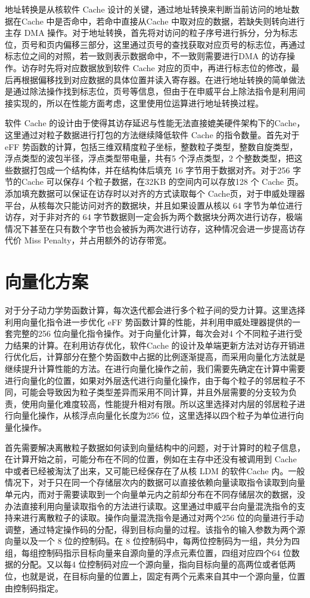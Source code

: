 地址转换是从核软件 Cache 设计的关键，通过地址转换来判断当前访问的地址数据在Cache 中是否命中，若命中直接从Cache 中取对应的数据，若缺失则转向进行主存 DMA 操作。对于地址转换，首先将对访问的粒子序号进行拆分，分为标志位，页号和页内偏移三部分，这里通过页号的查找获取对应页号的标志位，再通过标志位之间的对照，若一致则表示数据命中，不一致则需要进行DMA 的访存操作。访存时先将对应数据放到软件 Cache 对应的页中，再进行标志位的修改，最后再根据偏移找到对应数据的具体位置并读入寄存器。在进行地址转换的简单做法是通过除法操作找到标志位，页号等信息，但由于在申威平台上除法指令是利用间接实现的，所以在性能方面考虑，这里使用位运算进行地址转换过程。

软件 Cache 的设计由于使得其访存延迟与性能无法直接媲美硬件架构下的Cache，这里通过对粒子数据进行打包的方法继续降低软件 Cache 的指令数量。首先对于 eFF 势函数的计算，包括三维双精度粒子坐标，整数粒子类型，整数自旋类型，浮点类型的波包半径，浮点类型带电量，共有5 个浮点类型，2 个整数类型，把这些数据打包成一个结构体，并在结构体后填充 16 字节用于数据对齐。对于256 字节的Cache 可以保存4 个粒子数据，在32KB 的空间内可以存放128 个 Cache 页。添加填充数据可以保证在访存时以对齐的方式读取每个 Cache页，对于申威处理器平台，从核每次只能访问对齐的数据块，并且如果设置从核以 64 字节为单位进行访存，对于非对齐的 64 字节数据则一定会拆为两个数据块分两次进行访存，极端情况下甚至在只有数个字节也会被拆为两次进行访存，这种情况会进一步提高访存代价 Miss Penalty，并占用额外的访存带宽。

\section{向量化方案}
对于分子动力学势函数计算，每次迭代都会进行多个粒子间的受力计算。这里选择利用向量化指令进一步优化 eFF 势函数计算的性能，并利用申威处理器提供的一套完整的256 位向量化指令操作。对于向量化计算，每次会对4 个不同粒子进行受力结果的计算。在利用访存优化，软件Cache 的设计及单端更新方法对访存开销进行优化后，计算部分在整个势函数中占据的比例逐渐提高，而采用向量化方法就是继续提升计算性能的方法。在进行向量化操作之前，我们需要先确定在计算中需要进行向量化的位置，如果对外层迭代进行向量化操作，由于每个粒子的邻居粒子不同，可能会导致因为粒子类型差异而采用不同计算，并且外层需要的分支较为负责，使用向量化难度较高，性能提升相对有限。所以这里选择对内层的邻居粒子进行向量化操作，从核浮点向量化长度为256 位，这里选择以四个粒子为单位进行向量化操作。

首先需要解决离散粒子数据如何读到向量结构中的问题，对于计算时的粒子信息，在计算开始之前，可能分布在不同的位置，例如在主存中还没有被调用到 Cache 中或者已经被淘汰了出来，又可能已经保存在了从核 LDM 的软件Cache 内。一般情况下，对于只在同一个存储层次内的数据可以直接依赖向量读取指令读取到向量单元内，而对于需要读取到一个向量单元内之前却分布在不同存储层次的数据，没办法直接利用向量读取指令的方法进行读取。这里通过申威平台向量混洗指令的支持来进行离散粒子的读取。操作向量混洗指令是通过对两个256 位的向量进行手动调整，通过特定操作码的分配，得到目标向量的过程。该指令的输入参数为两个源向量以及一个 8 位的控制码。在 8 位控制码中，每两位控制码为一组，共分为四组，每组控制码指示目标向量来自源向量的浮点元素位置，四组对应四个64 位数据的分配。又以每4 位控制码对应一个源向量，指向目标向量的高两位或者低两位，也就是说，在目标向量的位置上，固定有两个元素来自其中一个源向量，位置由控制码指定。

